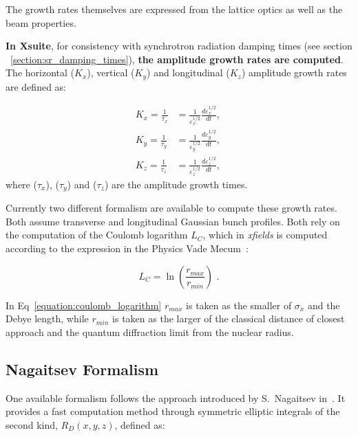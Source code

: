 The growth rates themselves are expressed from the lattice optics as well as the beam properties.

\textbf{In Xsuite}, for consistency with synchrotron radiation damping times (see section ~\ref{section:sr_damping_times}), \textbf{the amplitude growth rates are computed}.
The horizontal (\(K_x\)), vertical (\(K_y\)) and longitudinal (\(K_z\)) amplitude growth rates are defined as:

\begin{equation}
    \begin{aligned}
        K_x = \frac{1}{\tau_x} &= \frac{1}{\varepsilon^{1/2}_x} \frac{d \varepsilon^{1/2}_x}{dt} \text{,  } \\
        K_y = \frac{1}{\tau_y} &= \frac{1}{\varepsilon^{1/2}_y} \frac{d \varepsilon^{1/2}_y}{dt} \text{,  } \\
        K_z = \frac{1}{\tau_z} &= \frac{1}{\varepsilon^{1/2}_z} \frac{d \varepsilon^{1/2}_z}{dt} \text{, }
    \end{aligned}
    \label{equation:ibs_rms_emittances_evolutions}
\end{equation}
where (\(\tau_x\)), (\(\tau_y\)) and (\(\tau_z\)) are the amplitude growth times.
\newline

Currently two different formalism are available to compute these growth rates.
Both assume transverse and longitudinal Gaussian bunch profiles.
Both rely on the computation of the Coulomb logarithm \(L_C\), which in \textit{xfields} is computed according to the expression in the Physics Vade Mecum~\cite{AIP:Anderson:Physics_Vade_Mecum}:

\begin{equation}
    L_C = \ln \left( \frac{r_{max}}{r_{min}} \right) \text{ .}
    \label{equation:coulomb_logarithm}
\end{equation}

In Eq~\eqref{equation:coulomb_logarithm} \(r_{max}\) is taken as the smaller of \(\sigma_x\) and the Debye length, while \(r_{min}\) is taken as the larger of the classical distance of closest approach and the quantum diffraction limit from the nuclear radius.

\subsection{Nagaitsev Formalism}
\label{subsection:nagaitsev_formalism}

One available formalism follows the approach introduced by S.~Nagaitsev in~\cite{PRAB:Nagaitsev:IBS_formulas_fast_numerical_evaluation}.
It provides a fast computation method through symmetric elliptic integrals of the second kind, \(R_D(x,y,z)\), defined as:

